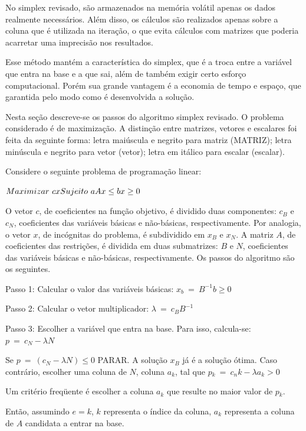 No simplex revisado, são armazenados na memória volátil apenas os dados realmente necessários. Além disso, os cálculos são realizados apenas sobre a coluna que é utilizada na iteração, o que evita cálculos com matrizes que poderia acarretar uma imprecisão nos resultados.

Esse método mantém a característica do simplex, que é a troca entre a variável que entra na base e a que sai, além de também exigir certo esforço computacional. Porém sua grande vantagem é a economia de tempo e espaço, que garantida pelo modo como é desenvolvida a solução. 

Nesta seção descreve-se os passos do algoritmo simplex revisado. O problema considerado é de maximização. A distinção entre matrizes, vetores e escalares foi feita da seguinte forma: letra maiúscula e negrito para matriz (MATRIZ); letra minúscula e negrito para vetor (vetor); letra em itálico para escalar (escalar).

Considere o seguinte problema de programação linear:

$\\
Maximizar\ cx \\
Sujeito\ a \\
Ax \leq b \\
x \geq0$

O vetor $c$, de coeficientes na função objetivo, é dividido duas componentes: $c{_B}$ e $c{_N}$, coeficientes das variáveis básicas e não-básicas, respectivamente. Por analogia, o vetor $x$, de incógnitas do problema, é subdividido em $x{_B}$ e $x{_N}$.  A matriz $A$, de coeficientes das restrições, é dividida em duas submatrizes: $B$ e $N$, coeficientes das variáveis básicas e não-básicas, respectivamente. Os passos do algoritmo são os seguintes.

Passo 1: Calcular o valor das variáveis básicas: $x_{b}\ =\ B^{-1}b\geq0$

Passo 2: Calcular o vetor multiplicador: $\lambda \ =\ c{_B}B^{-1}$

Passo 3: Escolher a variável que entra na base. Para isso, calcula-se: $p\ =\ c{_N}-\lambda N$

Se $p\ =\ (c{_N}-\lambda N)\leq 0$ PARAR. A solução $x{_B}$ já é a solução ótima. Caso contrário, escolher uma coluna de $N$, coluna $a{_k}$, tal que $p{_k}\ =\ c{_nk}-\lambda a{_k}> 0$

Um critério freqüente é escolher a coluna $a{_k}$ que resulte no maior valor de $p{_k}$.

Então, assumindo $e = k$, $k$ representa o índice da coluna, $a{_k}$ representa a coluna de $A$ candidata a entrar na base. 

